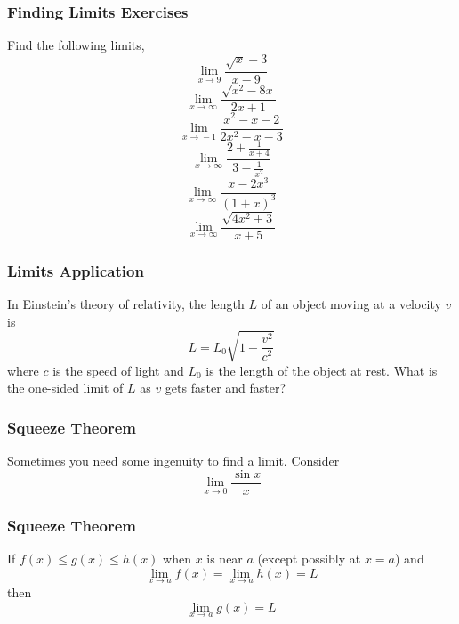 \documentclass[xcolor=dvipsnames]{beamer}
\begin{document}
\begin{frame}
  \frametitle{Finding Limits Exercises}
Find the following limits,
\begin{equation}
  \label{eq:ixahngoo}
\lim_{x\rightarrow{}9}\frac{\sqrt{x}-3}{x-9}
\end{equation}
\begin{equation}
  \label{eq:etheshoh}
\lim_{x\rightarrow\infty}\frac{\sqrt{x^{2}-8x}}{2x+1}
\end{equation}
\begin{equation}
  \label{eq:chahgaew}
\lim_{x\rightarrow{}-1}\frac{x^{2}-x-2}{2x^{2}-x-3}
\end{equation}
\begin{equation}
  \label{eq:oofeegae}
\lim_{x\rightarrow\infty}\frac{2+\frac{1}{x+4}}{3-\frac{1}{x^{2}}}
\end{equation}
\begin{equation}
  \label{eq:yupeethi}
\lim_{x\rightarrow\infty}\frac{x-2x^{3}}{(1+x)^{3}}
\end{equation}
\begin{equation}
  \label{eq:reibaize}
\lim_{x\rightarrow\infty}\frac{\sqrt{4x^{2}+3}}{x+5}
\end{equation}
\end{frame}

\begin{frame}
  \frametitle{Limits Application}
In Einstein's theory of relativity, the length $L$ of an object moving
at a velocity $v$ is 
\begin{equation}
  \label{eq:aumiepha}
L=L_{0}\sqrt{1-\frac{v^{2}}{c^{2}}}
\end{equation}
where $c$ is the speed of light and $L_{0}$ is the length of the
object at rest. What is the one-sided limit of $L$ as $v$ gets
faster and faster?
\end{frame}

\begin{frame}
  \frametitle{Squeeze Theorem}
Sometimes you need some ingenuity to find a limit. Consider
\begin{equation}
  \label{eq:iepichae}
  \lim_{x\rightarrow{}0}\frac{\sin{}x}{x}
\end{equation}
\end{frame}

\begin{frame}
  \frametitle{Squeeze Theorem}
  If $f(x)\leq{}g(x)\leq{}h(x)$ when $x$ is near $a$ (except possibly
  at $x=a$) and
  \begin{equation}
    \label{eq:ohphaese}
    \lim_{x\rightarrow{}a}f(x)=\lim_{x\rightarrow{}a}h(x)=L
  \end{equation}
  then
  \begin{equation}
    \label{eq:quaighea}
    \lim_{x\rightarrow{}a}g(x)=L
  \end{equation}
\end{frame}
\end{document}
